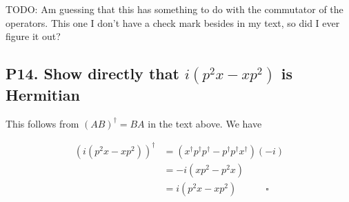 \documentclass{article}
\begin{document}
TODO:
Am guessing that this has something to do with the commutator of the operators.  This one I don't have a check mark
besides in my text, so did I ever figure it out?

\subsection{P14. Show directly that $i(p^2 x - xp^2)$ is Hermitian }

This follows from $(AB)^\dagger = BA$ in the text above.  We have

\begin{align*}
(i (p^2 x - x p^2))^\dagger 
&=
(x^\dagger p^\dagger p^\dagger - p^\dagger p^\dagger x^\dagger)(-i) \\
&=
-i (x p^2 - p^2 x) \\
&=
i (p^2 x - x p^2 ) \quad\quad\quad \square
\end{align*}



\end{document}
